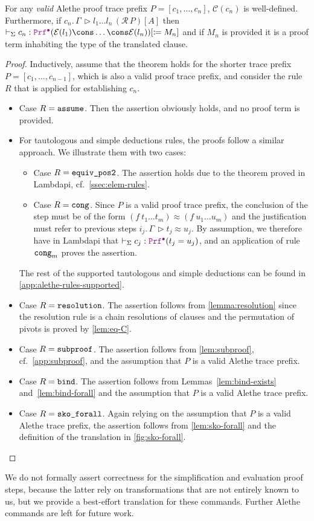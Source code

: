 \smallskip

\begin{theorem}\label{theorem:soundness}
  For any \emph{valid} Alethe proof trace prefix $P = [c_1, \dots, c_n]$, $\mathcal{C}(c_n)$ is well-defined. Furthermore, if $c_n.\,\Gamma\, \triangleright l_1 \dots l_n \, (\mathcal{R}\,P)[A]$ then $\vdash_\Sigma c_n : \pid (\E{l_1} \cons \dots  \cons \E{l_n}) [\coloneq M_n]$ and if $M_n$ is provided it is a proof term inhabiting the type of the translated clause.
\end{theorem}
\begin{proof}
  Inductively, assume that the theorem holds for the shorter trace prefix $P = [c_1, \dots, c_{n-1}]$, which is also a valid proof trace prefix, and consider the rule $R$ that is applied for establishing $c_n$.
  \begin{itemize}
  \item Case $R = \texttt{\upshape{assume}}$. Then the assertion obviously holds, and no proof term is provided.
  \item For tautologous and simple deductions rules, the proofs follow a similar approach. We illustrate them with two cases:
  \begin{itemize}
  \item Case $R = \texttt{\upshape{equiv\_pos2}}$. The assertion holds due to the theorem  proved in Lambdapi, cf.\ \cref{ssec:elem-rules}.
  \item Case $R = \texttt{\upshape{cong}}$. Since $P$ is a valid proof trace prefix, the conclusion of the step must be of the form $(f~t_1 \ldots t_m) \approx (f~u_1 \ldots u_m)$ and the justification must refer to previous steps $i_j.\,\Gamma\,\triangleright t_j \approx u_j$. By assumption, we therefore have in Lambdapi that $\vdash_{\Sigma} c_j: \pid (t_j = u_j)$, and an application of rule $\texttt{\upshape{cong}}_m$ proves the assertion.
  \end{itemize}
  The rest of the supported tautologous and simple deductions can be found in \cref{app:alethe-rules-supported}.
  \item Case $R = \texttt{\upshape{resolution}}$. The assertion follows from \cref{lemma:resolution} since the resolution rule is a chain resolutions of clauses and the permutation of pivots is proved by \cref{lem:eq-C}.
  \item Case $R = \texttt{\upshape{subproof}}$. The assertion follows from \cref{lem:subproof}, cf.\ \cref{app:subproof}, and the assumption that $P$ is a valid Alethe trace prefix.
  \item Case $R = \texttt{\upshape{bind}}$. The assertion follows from Lemmas~\ref{lem:bind-exists} and~\ref{lem:bind-forall} and the assumption that $P$ is a valid Alethe trace prefix.
  \item Case $R = \texttt{\upshape{sko\_forall}}$. Again relying on the assumption that $P$ is a valid Alethe trace prefix, the assertion follows from \cref{lem:sko-forall} and the definition of the translation in \cref{fig:sko-forall}.
  \end{itemize}
\end{proof}

We do not formally assert correctness for the simplification and evaluation proof steps, because the latter rely on transformations that are not entirely known to us, but we provide a best-effort translation for these commands. Further Alethe commands are left for future work.
